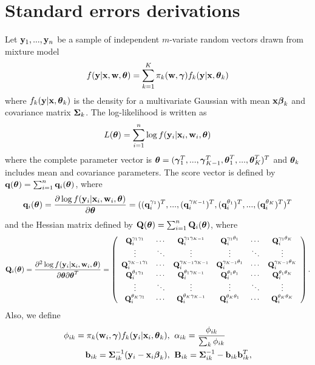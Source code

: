 \chapter{Standard errors derivations}\label{append:1}

Let $\mathbf y_{1},...,\mathbf y_{n}$ be a sample of independent $m$-variate random vectors drawn from mixture model
$$f(\mathbf y|\mathbf x, \mathbf w, \boldsymbol\theta) = \sum^{K}_{k=1}\pi_{k}(\mathbf w, \boldsymbol\gamma)f_{k}(\mathbf y|\mathbf x, \boldsymbol \theta_{k})$$
where $f_{k}(\mathbf y|\mathbf x, \boldsymbol \theta_{k})$ is the density for a multivariate Gaussian with mean $\mathbf x\boldsymbol\beta_{k}$ and covariance matrix $\boldsymbol\Sigma_{k}$. The log-likelihood is written as
$$L(\boldsymbol\theta)=\sum^{n}_{i=1}\log f(\mathbf y_{i}|\mathbf x_{i},\mathbf w_{i},\boldsymbol\theta)$$
where the complete parameter vector is $\boldsymbol\theta=(\boldsymbol\gamma_{1}^{T},...,\boldsymbol\gamma_{K-1}^{T},\boldsymbol\theta^{T}_{1},...,\boldsymbol\theta^{T}_{K})^{T}$ and $\boldsymbol\theta_{k}$ includes mean and covariance parameters. The score vector is defined by $\mathbf q(\boldsymbol\theta)=\sum_{i=1}^{n}\mathbf q_{i}(\boldsymbol \theta)$, where
$$\mathbf q_{i}(\boldsymbol\theta)=\frac{\partial \log f(\mathbf y_{i}|\mathbf x_{i},\mathbf w_{i},\boldsymbol\theta)}{\partial \boldsymbol\theta}=((\mathbf q^{\gamma_{1}}_{i})^{T},...,(\mathbf q^{\gamma_{K-1}}_{i})^{T},(\mathbf q^{\theta_{1}}_{i})^{T},...,(\mathbf q^{\theta_{K}}_{i})^{T})^{T}$$
and the Hessian matrix defined by $\mathbf Q(\boldsymbol\theta)=\sum_{i=1}^{n}\mathbf Q_{i}(\boldsymbol\theta)$, where
$$ \mathbf Q_{i}(\boldsymbol\theta)=\frac{\partial^{2} \log f(\mathbf y_{i}|\mathbf x_{i},\mathbf w_{i},\boldsymbol\theta)}{\partial \boldsymbol\theta\partial \boldsymbol\theta^{T}}=\left(\begin{array}{cccccc} \mathbf Q^{\gamma_{1}\gamma_{1}}_{i}&\cdots&\mathbf Q^{\gamma_{1}\gamma_{K-1}}_{i}&\mathbf Q^{\gamma_{1}\theta_{1}}_{i}&\cdots&\mathbf Q^{\gamma_{1}\theta_{K}}_{i}\\
\vdots&\ddots&\vdots&\vdots&\ddots&\vdots\\
\mathbf Q^{\gamma_{K-1}\gamma_{1}}_{i}&\cdots&\mathbf Q^{\gamma_{K-1}\gamma_{K-1}}_{i}&\mathbf Q^{\gamma_{K-1}\theta_{1}}_{i}&\cdots&\mathbf Q^{\gamma_{K-1}\theta_{K}}_{i}\\
\mathbf Q^{\theta_{1}\gamma_{1}}_{i}&\cdots&\mathbf Q^{\theta_{1}\gamma_{K-1}}_{i}&\mathbf Q^{\theta_{1}\theta_{1}}_{i}&\cdots&\mathbf Q^{\theta_{1}\theta_{K}}_{i}\\
\vdots&\ddots&\vdots&\vdots&\ddots&\vdots\\
\mathbf Q^{\theta_{K}\gamma_{1}}_{i}&\cdots&\mathbf Q^{\theta_{K}\gamma_{K-1}}_{i}&\mathbf Q^{\theta_{K}\theta_{1}}_{i}&\cdots&\mathbf Q^{\theta_{K}\theta_{K}}_{i}\\
\end{array} \right).$$
Also, we define
\begin{align}
\phi_{ik}=\pi_{k}(\mathbf w_{i},\boldsymbol\gamma)f_{k}(\mathbf y_{i}|\mathbf x_{i},\boldsymbol\theta_{k}),&\;\; \alpha_{ik}=\frac{\phi_{ik}}{\sum_{k}\phi_{ik}}\label{phi}\\
\mathbf b_{ik}=\boldsymbol\Sigma_{ik}^{-1}(\mathbf y_{i}-\mathbf x_{i}\boldsymbol\beta_{k}),&\;\; \mathbf B_{ik}=\boldsymbol\Sigma_{ik}^{-1}-\mathbf b_{ik}\mathbf b^{T}_{ik},\label{bs2}
\end{align}

